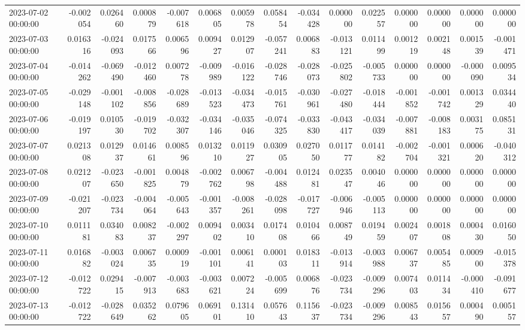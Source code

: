 \begin{tabular}{lrrrrrrrrrrrrrr}
2023-07-02 00:00:00 & -0.002054 & 0.026460 & 0.000879 & -0.007618 & 0.006805 & 0.005978 & 0.058454 & -0.034428 & 0.000000 & 0.022557 & 0.000000 & 0.000000 & 0.000000 & 0.000000 \\
2023-07-03 00:00:00 & 0.016316 & -0.024093 & 0.017566 & 0.006596 & 0.009427 & 0.012907 & -0.057241 & 0.006883 & -0.013121 & 0.011499 & 0.001219 & 0.002148 & 0.001539 & -0.001471 \\
2023-07-04 00:00:00 & -0.014262 & -0.069490 & -0.012460 & 0.007278 & -0.009989 & -0.016122 & -0.028746 & -0.028073 & -0.025802 & -0.005733 & 0.000000 & 0.000000 & -0.000090 & 0.009534 \\
2023-07-05 00:00:00 & -0.029148 & -0.001102 & -0.008856 & -0.028689 & -0.013523 & -0.034473 & -0.015761 & -0.030961 & -0.027480 & -0.018444 & -0.001852 & -0.001742 & 0.001329 & 0.034440 \\
2023-07-06 00:00:00 & -0.019197 & 0.010530 & -0.019702 & -0.032307 & -0.034146 & -0.035046 & -0.074325 & -0.033830 & -0.043417 & -0.034039 & -0.007881 & -0.008183 & 0.003175 & 0.085131 \\
2023-07-07 00:00:00 & 0.021308 & 0.012937 & 0.014661 & 0.008596 & 0.013210 & 0.011927 & 0.030905 & 0.027050 & 0.011777 & 0.014182 & -0.002704 & -0.001321 & 0.000620 & -0.040312 \\
2023-07-08 00:00:00 & 0.021207 & -0.023650 & -0.001825 & 0.004879 & -0.002762 & 0.006798 & -0.004488 & 0.012481 & 0.023547 & 0.004046 & 0.000000 & 0.000000 & 0.000000 & 0.000000 \\
2023-07-09 00:00:00 & -0.021207 & -0.023734 & -0.004064 & -0.005643 & -0.001357 & -0.008261 & -0.028098 & -0.017727 & -0.006946 & -0.005113 & 0.000000 & 0.000000 & 0.000000 & 0.000000 \\
2023-07-10 00:00:00 & 0.011181 & 0.034083 & 0.008237 & -0.002297 & 0.009402 & 0.003410 & 0.017408 & 0.010466 & 0.008749 & 0.019459 & 0.002407 & 0.001808 & 0.000430 & 0.016050 \\
2023-07-11 00:00:00 & 0.016882 & -0.003024 & 0.006735 & 0.000919 & -0.001101 & 0.006141 & 0.000103 & 0.018311 & -0.013914 & -0.003988 & 0.006737 & 0.005485 & 0.000900 & -0.015378 \\
2023-07-12 00:00:00 & -0.012722 & 0.029415 & -0.007913 & -0.003683 & -0.003621 & 0.007224 & -0.005699 & 0.006876 & -0.023734 & -0.009296 & 0.007403 & 0.011434 & -0.000410 & -0.091677 \\
2023-07-13 00:00:00 & -0.012722 & -0.028649 & 0.035262 & 0.079605 & 0.069101 & 0.131410 & 0.057643 & 0.115637 & -0.023734 & -0.009296 & 0.008543 & 0.015657 & 0.000490 & 0.005157 \\

\end{tabular}
